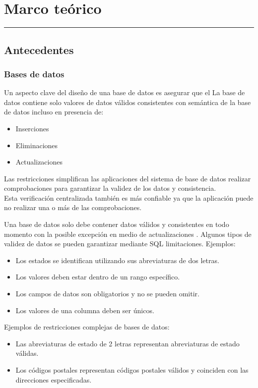 \chapter{Marco teórico}
\hrule  \vspace*{0.5cm}
\section{Antecedentes}
\subsection{Bases de datos}
Un aspecto clave del diseño de una base de datos es asegurar que el
La base de datos contiene solo valores de datos válidos consistentes con
semántica de la base de datos incluso en presencia de:
\begin{itemize}
    \item Inserciones
    \item Eliminaciones
    \item Actualizaciones
\end{itemize}
Las restricciones simplifican las aplicaciones del sistema de base de datos
realizar comprobaciones para garantizar la validez de los datos y
consistencia.\\
Esta verificación centralizada también es más confiable ya que la aplicación puede no realizar una o más de las comprobaciones.

Una base de datos solo debe contener datos válidos y consistentes
en todo momento con la posible excepción en medio de
actualizaciones \cite{gehani1990introduction}.
Algunos tipos de validez de datos se pueden garantizar mediante SQL
limitaciones.
Ejemplos:
\begin{itemize}
    \item Los estados se identifican utilizando sus abreviaturas de dos letras.
    \item Los valores deben estar dentro de un rango específico.
    \item Los campos de datos son obligatorios y no se pueden omitir.
    \item Los valores de una columna deben ser únicos.
\end{itemize}
Ejemplos de restricciones complejas de bases de datos:
\begin{itemize}
    \item Las abreviaturas de estado de 2 letras representan abreviaturas de estado válidas.
    \item Los códigos postales representan códigos postales válidos y coinciden con las direcciones especificadas.
\end{itemize}
